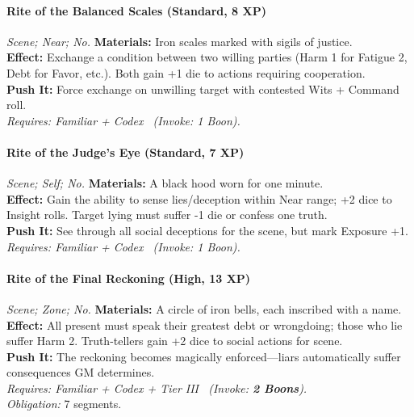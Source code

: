 \paragraph{Rite of the Balanced Scales (Standard, 8 XP)} \emph{Scene; Near; No.}
\textbf{Materials:} Iron scales marked with sigils of justice. \\
\textbf{Effect:} Exchange a condition between two willing parties (Harm 1 for Fatigue 2, Debt for Favor, etc.). Both gain +1 die to actions requiring cooperation. \\
\textbf{Push It:} Force exchange on unwilling target with contested Wits + Command roll. \\
\emph{Requires: Familiar + Codex \ (\textit{Invoke:} 1 Boon).}

\paragraph{Rite of the Judge's Eye (Standard, 7 XP)} \emph{Scene; Self; No.}
\textbf{Materials:} A black hood worn for one minute. \\
\textbf{Effect:} Gain the ability to sense lies/deception within Near range; +2 dice to Insight rolls. Target lying must suffer -1 die or confess one truth. \\
\textbf{Push It:} See through all social deceptions for the scene, but mark Exposure +1. \\
\emph{Requires: Familiar + Codex \ (\textit{Invoke:} 1 Boon).}

\paragraph{Rite of the Final Reckoning (High, 13 XP)} \emph{Scene; Zone; No.}
\textbf{Materials:} A circle of iron bells, each inscribed with a name. \\
\textbf{Effect:} All present must speak their greatest debt or wrongdoing; those who lie suffer Harm 2. Truth-tellers gain +2 dice to social actions for scene. \\
\textbf{Push It:} The reckoning becomes magically enforced—liars automatically suffer consequences GM determines. \\
\emph{Requires: Familiar + Codex + Tier III \ (\textit{Invoke:} \textbf{2 Boons}).} \\
\emph{Obligation:} 7 segments.

